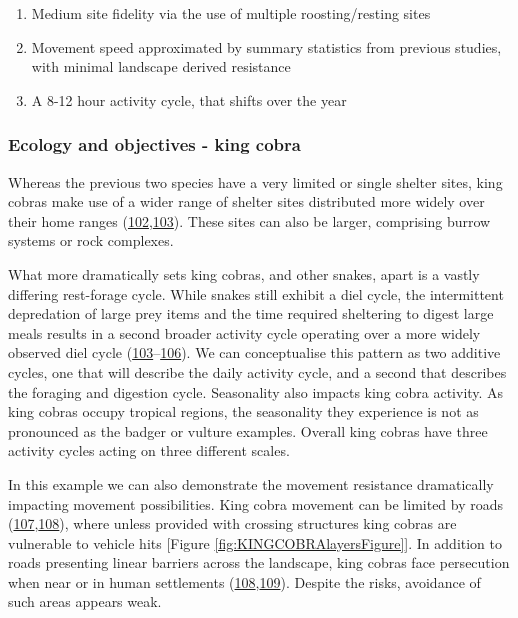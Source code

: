 \documentclass[10pt,a4paper]{article}
\begin{document}
\begin{enumerate}
\def\labelenumi{\arabic{enumi}.}
\item
  Medium site fidelity via the use of multiple roosting/resting sites
\item
  Movement speed approximated by summary statistics from previous studies, with minimal landscape derived resistance
\item
  A 8-12 hour activity cycle, that shifts over the year
\end{enumerate}

\hypertarget{ecology-and-objectives---king-cobra}{%
\subsubsection{Ecology and objectives - king cobra}\label{ecology-and-objectives---king-cobra}}

Whereas the previous two species have a very limited or single shelter sites, king cobras make use of a wider range of shelter sites distributed more widely over their home ranges (\protect\hyperlink{ref-Marshall2018}{102},\protect\hyperlink{ref-marshall_no_2020}{103}).
These sites can also be larger, comprising burrow systems or rock complexes.

What more dramatically sets king cobras, and other snakes, apart is a vastly differing rest-forage cycle.
While snakes still exhibit a diel cycle, the intermittent depredation of large prey items and the time required sheltering to digest large meals results in a second broader activity cycle operating over a more widely observed diel cycle (\protect\hyperlink{ref-marshall_no_2020}{103}--\protect\hyperlink{ref-Siers2018}{106}).
We can conceptualise this pattern as two additive cycles, one that will describe the daily activity cycle, and a second that describes the foraging and digestion cycle.
Seasonality also impacts king cobra activity.
As king cobras occupy tropical regions, the seasonality they experience is not as pronounced as the badger or vulture examples.
Overall king cobras have three activity cycles acting on three different scales.

In this example we can also demonstrate the movement resistance dramatically impacting movement possibilities.
King cobra movement can be limited by roads (\protect\hyperlink{ref-jones_how_2022}{107},\protect\hyperlink{ref-Marshall2018b}{108}), where unless provided with crossing structures king cobras are vulnerable to vehicle hits {[}Figure \ref{fig:KINGCOBRAlayersFigure}{]}.
In addition to roads presenting linear barriers across the landscape, king cobras face persecution when near or in human settlements (\protect\hyperlink{ref-Marshall2018b}{108},\protect\hyperlink{ref-Shankar2013}{109}).
Despite the risks, avoidance of such areas appears weak.
\end{document}
